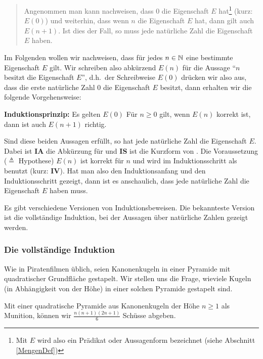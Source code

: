 \begin{quote}
Angenommen man kann nachweisen, dass $0$ die Eigenschaft 
$E$ hat\footnote{Mit $E$ wird also ein Prädikat oder Aussagenform bezeichnet (siehe Abschnitt 
\ref{MengenDef})} (kurz: $E(0)$) und weiterhin, dass wenn $n$ die Eigenschaft $E$ hat, dann gilt auch 
$E(n+1)$. Ist dies der Fall, so muss jede natürliche Zahl die Eigenschaft $E$ haben. 
\end{quote}

Im Folgenden wollen wir nachweisen, dass für jedes $n \in \mathbb N$ eine bestimmte Eigenschaft $E$ gilt. Wir
schreiben also abkürzend $E(n)$ für die Aussage "`$n$ besitzt die Eigenschaft
$E$"', d.h.~der Schreibweise $E(0)$ drücken wir also
aus, dass die erste natürliche Zahl $0$ die Eigenschaft $E$ besitzt, dann 
erhalten wir die folgende Vorgehensweise:

\medskip
\goodbreak

\noindent\textbf{Induktionsprinzip:} Es gelten
\indudef%
{$E(0)$}%
{Für $n \ge 0$ gilt, wenn $E(n)$ korrekt ist,
dann ist auch $E(n+1)$ richtig.}
\medskip

Sind diese beiden Aussagen erfüllt, so hat jede natürliche Zahl die Eigenschaft $E$. 
Dabei ist \textbf{\textsf{IA}} die Abkürzung für
 und \textbf{\textsf{IS}} ist die Kurzform von
. Die Voraussetzung ($\triangleq$ Hypothese)
$E(n)$ ist korrekt für $n$ und wird im Induktionsschritt
als  benutzt
(kurz: \textbf{\textsf{IV}}). Hat man also den Induktionsanfang und den
Induktionsschritt gezeigt, dann ist es anschaulich, dass jede natürliche Zahl die
Eigenschaft $E$ haben muss.

Es gibt verschiedene Versionen von Induktionsbeweisen. Die bekannteste
Version ist die vollständige Induktion, bei der Aussagen über
natürliche Zahlen gezeigt werden.

\subsubsection{Die vollständige Induktion}

Wie in Piratenfilmen üblich, seien Kanonenkugeln in einer Pyramide mit
quadratischer Grundfläche gestapelt. Wir stellen uns die Frage,
wieviele Kugeln (in Abhängigkeit von der Höhe) in einer solchen
Pyramide gestapelt sind.

\begin{theorem}
\label{Pyramid}
Mit einer quadratische Pyramide aus Kanonenkugeln der Höhe $n \ge 1$
als Munition, können wir $\frac{n(n+1)(2n+1)}{6}$ Schüsse abgeben.
\end{theorem}

